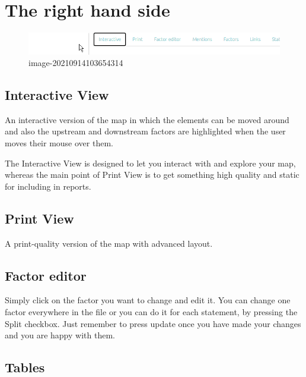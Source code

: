 \documentclass[
]{book}
\begin{document}
\hypertarget{rhs}{%
\section{The right hand side}\label{rhs}}

\begin{figure}
\centering
\includegraphics[width=6.77083in,height=\textheight]{_assets/image-20210914103654314.png}
\caption{image-20210914103654314}
\end{figure}

\hypertarget{not2}{%
\subsection{Interactive View}\label{not2}}

An interactive version of the map in which the elements can be moved around and also the upstream and downstream factors are highlighted when the user moves their mouse over them.

The Interactive View is designed to let you interact with and explore your map, whereas the main point of Print View is to get something high quality and static for including in reports.

\hypertarget{not}{%
\subsection{Print View}\label{not}}

A print-quality version of the map with advanced layout.

\hypertarget{no-not-this-one}{%
\subsection{Factor editor}\label{no-not-this-one}}

Simply click on the factor you want to change and edit it. You can change one factor everywhere in the file or you can do it for each statement, by pressing the Split checkbox. Just remember to press update once you have made your changes and you are happy with them.

\hypertarget{tables}{%
\subsection{Tables}\label{tables}}
\end{document}
